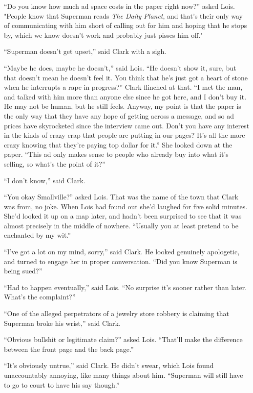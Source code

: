 ``Do you know how much ad space costs in the paper right now?'' asked
Lois. "People know that Superman reads \emph{The Daily Planet}, and
that's their only way of communicating with him short of calling out for
him and hoping that he stops by, which we know doesn't work and probably
just pisses him off."

``Superman doesn't get upset,'' said Clark with a sigh.

``Maybe he does, maybe he doesn't,'' said Lois. ``He doesn't show it,
sure, but that doesn't mean he doesn't feel it. You think that he's just
got a heart of stone when he interrupts a rape in progress?'' Clark
flinched at that. ``I met the man, and talked with him more than anyone
else since he got here, and I don't buy it. He may not be human, but he
still feels. Anyway, my point is that the paper is the only way that
they have any hope of getting across a message, and so ad prices have
skyrocketed since the interview came out. Don't you have any interest in
the kinds of crazy crap that people are putting in our pages? It's all
the more crazy knowing that they're paying top dollar for it.'' She
looked down at the paper. ``This ad only makes sense to people who
already buy into what it's selling, so what's the point of it?''

``I don't know,'' said Clark.

``You okay Smallville?'' asked Lois. That was the name of the town that
Clark was from, no joke. When Lois had found out she'd laughed for five
solid minutes. She'd looked it up on a map later, and hadn't been
surprised to see that it was almost precisely in the middle of nowhere.
``Usually you at least pretend to be enchanted by my wit.''

``I've got a lot on my mind, sorry,'' said Clark. He looked genuinely
apologetic, and turned to engage her in proper conversation. ``Did you
know Superman is being sued?''

``Had to happen eventually,'' said Lois. ``No surprise it's sooner
rather than later. What's the complaint?''

``One of the alleged perpetrators of a jewelry store robbery is claiming
that Superman broke his wrist,'' said Clark.

``Obvious bullshit or legitimate claim?'' asked Lois. ``That'll make the
difference between the front page and the back page.''

``It's obviously untrue,'' said Clark. He didn't swear, which Lois found
unaccountably annoying, like many things about him. ``Superman will
still have to go to court to have his say though.''

